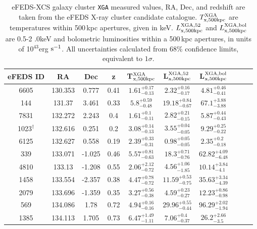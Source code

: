 \documentclass[fleqn,usenatbib]{mnras}
\begin{document}
\begin{table}
\begin{center}
\caption[]{{eFEDS-XCS galaxy cluster \texttt{XGA} measured values, RA, Dec, and redshift are taken from the eFEDS X-ray cluster candidate catalogue. $T^{\rm{XGA}}_{\rm{x}, 500kpc}$ are temperatures within 500\,kpc apertures, given in keV. $L^{\rm{XGA, 52}}_{\rm{x, 500kpc}}$ and $L^{\rm{XGA, bol}}_{\rm{x, 500kpc}}$ are 0.5-2 .0keV and bolometric luminosities within a 500\,kpc apertures, in units of 10$^{43}$erg $\rm{s}^{-1}$. All uncertainties calculated from 68\% confidence limits, equivalent to $1\sigma$.}\label{tab:measurements}}
\vspace{1mm}
\begin{tabular}{cccccccccc}
\hline
\hline
eFEDS ID & RA & Dec & z & T$^{\rm{XGA}}_{\rm{x}, 500kpc}$ & L$^{\rm{XGA, 52}}_{\rm{x, 500kpc}}$ & L$^{\rm{XGA, bol}}_{\rm{x, 500kpc}}$\\
\hline
\hline
6605 & 130.353 & 0.777 & 0.41 & $1.61^{+0.17}_{-0.13}$ & $2.32^{+0.16}_{-0.17}$ & $4.81^{+0.46}_{-0.41}$ \\ 
\hline
144 & 131.37 & 3.461 & 0.33 & $5.8^{+0.59}_{-0.48}$ & $19.18^{+0.84}_{-0.67}$ & $67.1^{+3.88}_{-3.88}$ \\ 
\hline
7831 & 132.272 & 2.243 & 0.4 & $1.61^{+0.1}_{-0.11}$ & $2.82^{+0.21}_{-0.15}$ & $5.87^{+0.44}_{-0.43}$ \\ 
\hline
1023$^{\dagger}$ & 132.616 & 0.251 & 0.2 & $3.08^{+0.14}_{-0.13}$ & $3.55^{+0.04}_{-0.05}$ & $9.29^{+0.25}_{-0.22}$ \\ 
\hline
6125 & 132.627 & 0.558 & 0.19 & $2.39^{+0.33}_{-0.31}$ & $0.98^{+0.05}_{-0.05}$ & $2.35^{+0.2}_{-0.18}$ \\ 
\hline
339 & 133.071 & -1.025 & 0.46 & $5.57^{+0.81}_{-0.63}$ & $18.3^{+0.71}_{-0.76}$ & $62.82^{+4.09}_{-6.48}$ \\ 
\hline
4810 & 133.13 & -1.208 & 0.55 & $2.06^{+2.12}_{-0.72}$ & $4.56^{+1.06}_{-1.85}$ & $10.14^{+3.84}_{-4.1}$ \\ 
\hline
1458 & 133.554 & -2.357 & 0.38 & $4.47^{+0.78}_{-0.72}$ & $11.59^{+0.53}_{-0.75}$ & $35.63^{+3.34}_{-4.39}$ \\ 
\hline
2079 & 133.696 & -1.359 & 0.35 & $3.27^{+0.56}_{-0.38}$ & $4.59^{+0.23}_{-0.27}$ & $12.23^{+0.86}_{-0.98}$ \\ 
\hline
569 & 134.086 & 1.78 & 0.72 & $4.94^{+0.16}_{-0.16}$ & $29.96^{+0.55}_{-0.44}$ & $96.29^{+2.02}_{-1.94}$ \\ 
\hline
1385 & 134.113 & 1.705 & 0.73 & $6.47^{+1.49}_{-1.11}$ & $7.06^{+0.4}_{-0.37}$ & $26.2^{+2.66}_{-3.5}$ \\ 

\end{tabular}
\end{center}
\end{table}
\end{document}
